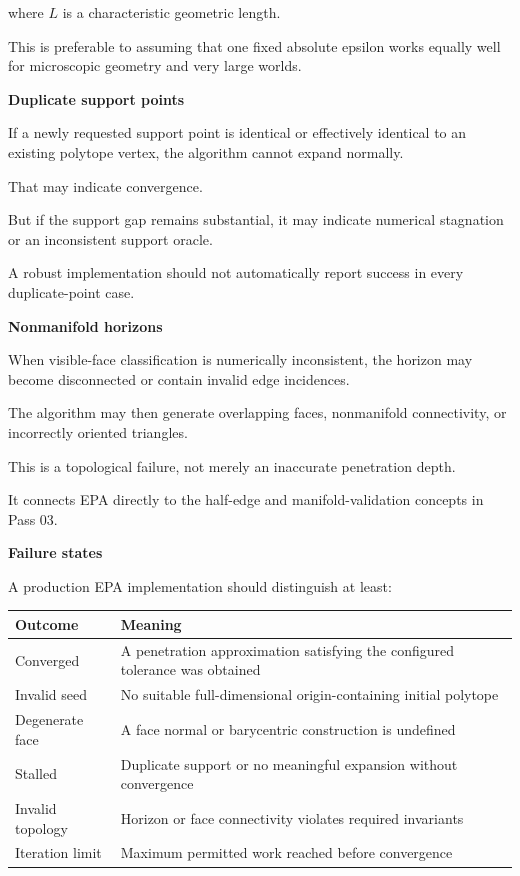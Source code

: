 where \(L\) is a characteristic geometric length.

This is preferable to assuming that one fixed absolute epsilon works equally well for microscopic geometry and very large worlds.

\textbf{Duplicate support points}

If a newly requested support point is identical or effectively identical to an existing polytope vertex, the algorithm cannot expand normally.

That may indicate convergence.

But if the support gap remains substantial, it may indicate numerical stagnation or an inconsistent support oracle.

A robust implementation should not automatically report success in every duplicate-point case.

\textbf{Nonmanifold horizons}

When visible-face classification is numerically inconsistent, the horizon may become disconnected or contain invalid edge incidences.

The algorithm may then generate overlapping faces, nonmanifold connectivity, or incorrectly oriented triangles.

This is a topological failure, not merely an inaccurate penetration depth.

It connects EPA directly to the half-edge and manifold-validation concepts in Pass 03.

\textbf{Failure states}

A production EPA implementation should distinguish at least:

{\def\LTcaptype{none} %
\begin{longtable}[]{@{}
  >{\raggedright\arraybackslash}p{}
  >{\raggedright\arraybackslash}p{}@{}}
\toprule\noalign{}
\begin{minipage}[b]{\linewidth}\raggedright
Outcome
\end{minipage} & \begin{minipage}[b]{\linewidth}\raggedright
Meaning
\end{minipage} \\
\midrule\noalign{}
\endhead
\bottomrule\noalign{}
\endlastfoot
Converged & A penetration approximation satisfying the configured tolerance was obtained \\
Invalid seed & No suitable full-dimensional origin-containing initial polytope \\
Degenerate face & A face normal or barycentric construction is undefined \\
Stalled & Duplicate support or no meaningful expansion without convergence \\
Invalid topology & Horizon or face connectivity violates required invariants \\
Iteration limit & Maximum permitted work reached before convergence \\
\end{longtable}
}

